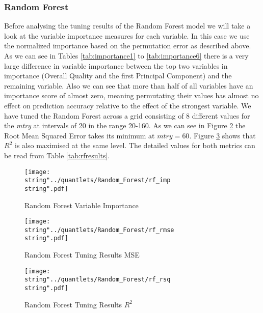 \subsubsection{Random Forest}
Before analysing the tuning results of the Random Forest model we will take a look at the variable importance measures for each variable. In this case we use the normalized importance based on the permutation error as described above. As we can see in Tables \ref{tab:importance1} to \ref{tab:importance6} there is a very large difference in variable importance between the top two variables in importance (Overall Quality and the first Principal Component) and the remaining variable. Also we can see that more than half of all variables have an importance score of almost zero, meaning permutating their values has almost no effect on prediction accuracy relative to the effect of the strongest variable. 
We have tuned the Random Forest across a grid consisting of 8 different values for the \textit{mtry} at intervals of 20 in the range 20-160. As we can see in Figure \ref{fig:rf_rmse} the Root Mean Squared Error takes its minimum at $mtry = 60$. Figure \ref{fig:rf_rsq} shows that $R^2$ is also maximised at the same level. The detailed values for both metrics can be read from Table \ref{tab:rfresults}.







\begin{figure}
  \centering
\texttt{[image: \\string"../quantlets/Random\_Forest/rf\_imp\\string".pdf]}
  \caption{Random Forest Variable Importance}\label{fig:rf_imp}
\end{figure}

\begin{figure}
  \centering
\texttt{[image: \\string"../quantlets/Random\_Forest/rf\_rmse\\string".pdf]}
  \caption{Random Forest Tuning Results MSE}\label{fig:rf_rmse}
\end{figure}

\begin{figure}
  \centering
\texttt{[image: \\string"../quantlets/Random\_Forest/rf\_rsq\\string".pdf]}
  \caption{Random Forest Tuning Results $R^2$}\label{fig:rf_rsq}
\end{figure}